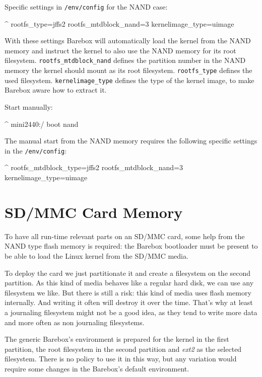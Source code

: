 Specific settings in \texttt{/env/config} for the NAND case:

\begin{ptxshell}[escapechar=|]{^}
rootfs_type=jffs2
rootfs_mtdblock_nand=3
kernelimage_type=uimage
\end{ptxshell}

With these settings Barebox will automatically load the kernel from the NAND
memory and instruct the kernel to also use the NAND memory for its root
filesystem. \texttt{rootfs\_mtdblock\_nand} defines the partition number in the
NAND memory the kernel should mount as its root filesystem. \texttt{rootfs\_type}
defines the used filesystem. \texttt{kernelimage\_type} defines the type of the
kernel image, to make Barebox aware how to extract it.

Start manually:

\begin{ptxshell}[escapechar=|]{^}
mini2440:/ boot nand
\end{ptxshell}

The manual start from the NAND memory requires the following specific settings
in the \texttt{/env/config}:

\begin{ptxshell}[escapechar=|]{^}
rootfs_mtdblock_type=jffs2
rootfs_mtdblock_nand=3
kernelimage_type=uimage
\end{ptxshell}

\section{SD/MMC Card Memory}				\label{sec:boot_sdcard}

To have all run-time relevant parts on an SD/MMC card, some help from the
NAND type flash memory is required: the Barebox bootloader must be present
to be able to load the Linux kernel from the SD/MMC media.

To deploy the card we just partitionate it and create a filesystem on the second
partition. As this kind of media behaves like a regular hard disk, we can use
any filesystem we like. But there is still a risk: this kind of media uses flash
memory internally. And writing it often will destroy it over the time. That's why
at least a journaling filesystem might not be a good idea, as they tend to write
more data and more often as non journaling filesystems.

The generic Barebox's environment is prepared for the kernel in the first partition,
the root filesystem in the second partition and \textit{ext2} as the selected
filesystem. There is no policy to use it in this way, but any variation would
require some changes in the Barebox's default environment.

